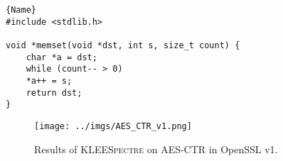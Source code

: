 \documentclass[12pt,a4paper]{book}
\theoremstyle{definition}
\begin{document}
	\begin{minipage}{.75\textwidth}
		\begin{lstlisting}[caption=\texttt{memcpy.c}, firstnumber=10, label=memset]{Name}
#include <stdlib.h>

void *memset(void *dst, int s, size_t count) {
	char *a = dst;
	while (count-- > 0)
	*a++ = s;
	return dst;
}
		\end{lstlisting}
	\end{minipage}
	\vspace{3mm}
	
	\begin{figure}
		\centering
		\texttt{[image: ../imgs/AES\_CTR\_v1.png]}
		\captionsetup{width=.8\linewidth}
		\caption{Results of \textsc{KLEESpectre} on AES-CTR in OpenSSL v1.}
		\label{fig:result_ctr_v1} 
	\end{figure}
	
\end{document}
